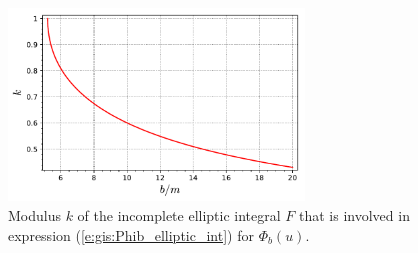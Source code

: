 \begin{figure}
\centerline{\includegraphics[width=0.7\textwidth]{gis_elliptic_mod.pdf}}
\caption[]{\label{f:gis:elliptic_mod} \footnotesize
Modulus $k$ of the incomplete elliptic integral $F$ that is involved
in expression (\ref{e:gis:Phib_elliptic_int}) for $\Phi_b(u)$.}
\end{figure}

